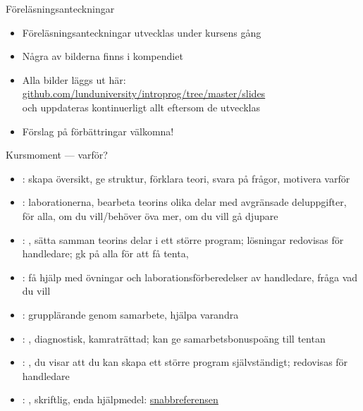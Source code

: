 \begin{Slide}{Föreläsningsanteckningar}
\begin{itemize}
\item Föreläsningsanteckningar utvecklas under kursens gång
\item Några av bilderna finns i kompendiet
\item Alla bilder läggs ut här: \\
\href{https://github.com/lunduniversity/introprog/tree/master/slides}{github.com/lunduniversity/introprog/tree/master/slides} \\
och uppdateras kontinuerligt allt eftersom de utvecklas
\item Förslag på förbättringar välkomna!
\end{itemize}
\end{Slide}

\begin{Slide}{Kursmoment --- varför?}\SlideOnly{\footnotesize}
\begin{itemize}
\item {}: skapa översikt, ge struktur, förklara teori, svara på frågor, motivera varför
\item {}:  laborationerna, bearbeta teorins olika delar med avgränsade deluppgifter,  för alla,  om du vill/behöver öva mer,  om du vill gå djupare 
\item {}: , sätta samman teorins delar i ett större program; lösningar redovisas för handledare; gk på alla för att få tenta, 
\item {}: få hjälp med övningar och laborationsförberedelser av handledare, fråga vad du vill
\item {}: grupplärande genom samarbete, hjälpa varandra 
\item {}: , diagnostisk, kamraträttad; kan ge samarbetsbonuspoäng till tentan
\item {}: , du visar att du kan skapa ett större program självständigt; redovisas för handledare
\item {}: , skriftlig, enda hjälpmedel:   \href{https://github.com/lunduniversity/introprog/blob/master/quickref/quickref.pdf}{snabbreferensen}
\end{itemize}
\end{Slide}


